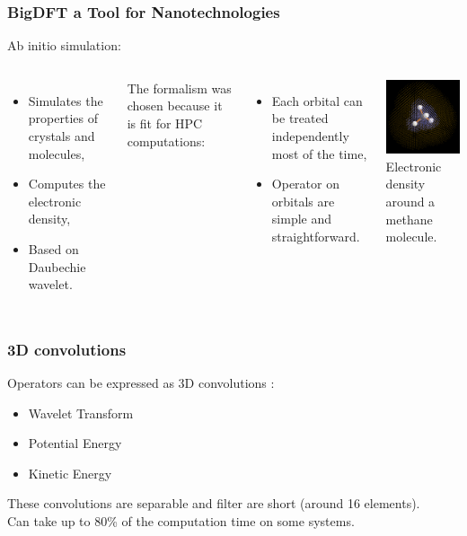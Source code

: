 \documentclass{beamer}
\begin{document}
\begin{frame}
    \frametitle{BigDFT a Tool for Nanotechnologies}
Ab initio simulation:
\begin{columns}
\column{6cm}
\begin{itemize}
  \item Simulates the properties of crystals and molecules,
  \item Computes the electronic density,
  \item Based on Daubechie wavelet.
\end{itemize}
The formalism was chosen because it is fit for HPC computations: 
\begin{itemize}
\item Each orbital can be treated independently most of the time,
\item Operator on orbitals are simple and straightforward.
\end{itemize}
\column{4.5cm}
\centering
\includegraphics[width=3.5cm]{CH4-grid.png}\\
Electronic density around a methane molecule.
\end{columns}
\end{frame}


\begin{frame}
  \frametitle{3D convolutions}
  Operators can be expressed as 3D convolutions :
  \begin{itemize}
    \item Wavelet Transform
    \item Potential Energy
    \item Kinetic Energy
  \end{itemize}
  These convolutions are separable and filter are short (around 16 elements).\\
  Can take up to 80\% of the computation time on some systems.
\end{frame}
\end{document}
